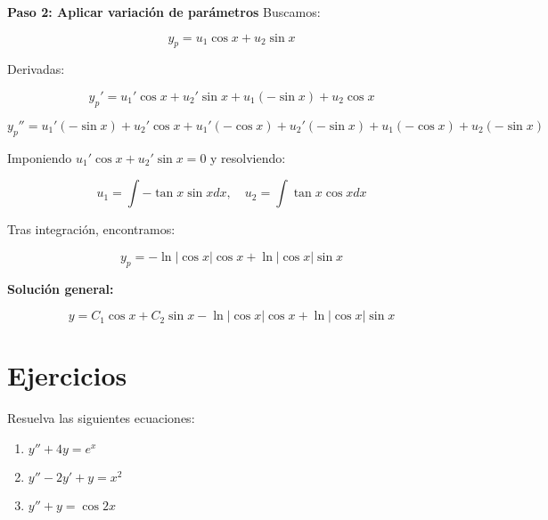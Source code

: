 \textbf{Paso 2: Aplicar variación de parámetros}
Buscamos:

\begin{equation}
y_p = u_1 \cos x + u_2 \sin x
\end{equation}

Derivadas:

\begin{equation}
y_p' = u_1' \cos x + u_2' \sin x + u_1 (-\sin x) + u_2 \cos x
\end{equation}

\begin{equation}
y_p'' = u_1' (-\sin x) + u_2' \cos x + u_1' (-\cos x) + u_2' (-\sin x) + u_1 (-\cos x) + u_2 (-\sin x)
\end{equation}

Imponiendo \( u_1' \cos x + u_2' \sin x = 0 \) y resolviendo:

\begin{equation}
u_1 = \int -\tan x \sin x dx, \quad u_2 = \int \tan x \cos x dx
\end{equation}

Tras integración, encontramos:

\begin{equation}
y_p = -\ln |\cos x| \cos x + \ln |\cos x| \sin x
\end{equation}

\textbf{Solución general:}

\begin{equation}
y = C_1 \cos x + C_2 \sin x - \ln |\cos x| \cos x + \ln |\cos x| \sin x
\end{equation}

\section{Ejercicios}
Resuelva las siguientes ecuaciones:

\begin{enumerate}
    \item \( y'' + 4y = e^x \)
    \item \( y'' - 2y' + y = x^2 \)
    \item \( y'' + y = \cos 2x \)
\end{enumerate}

